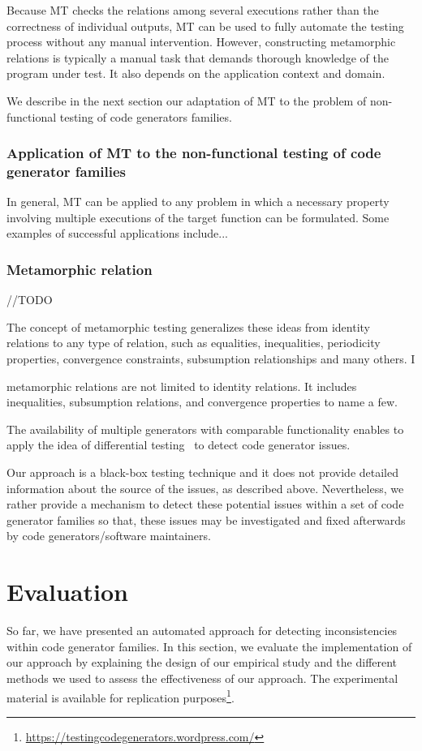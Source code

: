 Because MT checks the relations among several executions rather than the correctness of individual outputs, MT can be used to fully automate the testing process without any manual intervention. However, constructing metamorphic relations is typically a manual task that demands thorough knowledge of the program under test. It also depends on the application context and domain. 

We describe in the next section our adaptation of MT to the problem of non-functional testing of code generators families.

\subsubsection{Application of MT to the non-functional testing of code generator families}
In general, MT can be applied to any problem in which a necessary property involving multiple executions of the target function can be formulated. Some examples of successful applications include...

\subsubsection{Metamorphic relation}
//TODO

The concept of metamorphic testing generalizes
these ideas from identity relations to any type of relation,
such as equalities, inequalities, periodicity properties, convergence
constraints, subsumption relationships and many
others. I


metamorphic relations
are not limited to identity relations. It includes inequalities,
subsumption relations, and convergence properties to name a
few.

The availability of multiple generators with comparable functionality enables to apply the idea of differential testing~\cite{mckeeman1998differential} to detect code generator issues.

Our approach is a black-box testing technique and it does not provide detailed information about the source of the issues, as described above. Nevertheless, we rather provide a mechanism to detect these potential issues within a set of code generator families so that, these issues may be investigated and fixed afterwards by code generators/software maintainers.







\section{Evaluation}
\label{sec:cg_evaluation}
So far, we have presented an automated approach for detecting inconsistencies within code generator families. In this section, we evaluate the implementation of our approach by explaining the design of our empirical study and the different methods we used to assess the effectiveness of our approach. 
The experimental material is available for replication purposes\footnote{\url{https://testingcodegenerators.wordpress.com/}}.
